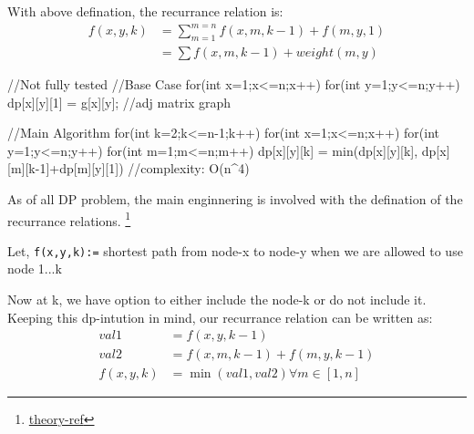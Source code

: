 With above defination, the recurrance relation is: \begin{align}
    f(x,y,k) &= \sum_{m=1}^{m=n} f(x,m,k-1) + f(m,y,1)\\
    &=\sum f(x,m,k-1) + weight(m,y)
\end{align}

\begin{code3}[code]
    //Not fully tested
    //Base Case
    for(int x=1;x<=n;x++)
    {
        for(int y=1;y<=n;y++)
        {
            dp[x][y][1] = g[x][y]; //adj matrix graph
        }
    }
    
    //Main Algorithm
    for(int k=2;k<=n-1;k++)
    {
        for(int x=1;x<=n;x++)
        {
            for(int y=1;y<=n;y++)
            {
                for(int m=1;m<=n;m++)
                {
                    dp[x][y][k] = 
                    min(dp[x][y][k], dp[x][m][k-1]+dp[m][y][1])
                }
            }
        }
    }
    //complexity: O(n^4)
\end{code3}

As of all DP problem, the main enginnering is involved with the defination of the recurrance relations.
\footnote{\href{https://youtu.be/v1qiRwuJU7g&t=1490}{theory-ref}}

Let, \verb|f(x,y,k):=| shortest path from node-x to node-y when we are allowed to use node 1...k

Now at k, we have option to either include the node-k or do not include it. Keeping this dp-intution in mind, our recurrance relation can be written as:
\begin{align}
    val1 &= f(x,y,k-1)\\
    val2 &= f(x,m,k-1) + f(m,y,k-1)\\
    f(x,y,k) &=  \min(val1,val2) \forall m\in[1,n]
\end{align}

